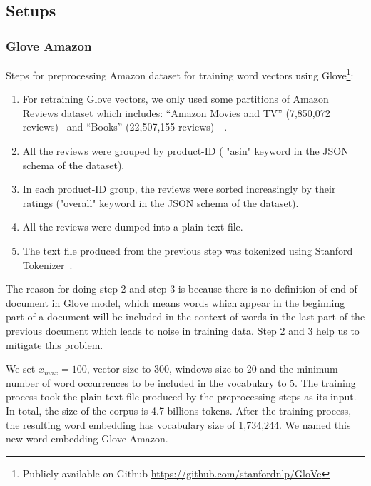 \subsection{Setups}
\subsubsection{Glove Amazon}
Steps for preprocessing Amazon dataset for training word vectors using Glove\footnote{Publicly available on Github \url{https://github.com/stanfordnlp/GloVe}}:
\begin{enumerate}
	\item For retraining Glove vectors, we only used some partitions of Amazon Reviews dataset which includes:  ``Amazon Movies and TV'' (7,850,072 reviews)~\cite{mcauley2013hidden} and ``Books'' (22,507,155 reviews)~\cite{McAuleyTSH15}~\cite{HeM16}.
	\item All the reviews were grouped by product-ID ( "asin" keyword in the JSON schema of the dataset).
	\item In each product-ID group, the reviews were sorted increasingly by their ratings ("overall" keyword in the JSON schema of the dataset).
	\item All the reviews were dumped into a plain text file.
	\item The text file produced from the previous step was tokenized using Stanford Tokenizer~\cite{tokenizerpart}.
\end{enumerate}

The reason for doing step 2 and step 3 is because there is no definition of end-of-document in Glove model, which means words which appear in the beginning part of a document will be included in the context of words in the last part of the previous document which leads to noise in training data. Step 2 and 3 help us to mitigate this problem.

We set $x_{max} = 100$, vector size to 300, windows size to 20 and the minimum number of word occurrences to be included in the vocabulary to 5.
The training process took the plain text file produced by the preprocessing steps as its input.
In total, the size of the corpus is 4.7 billions tokens.
After the training process, the resulting word embedding has vocabulary size of 1,734,244.
We named this new word embedding Glove Amazon.
